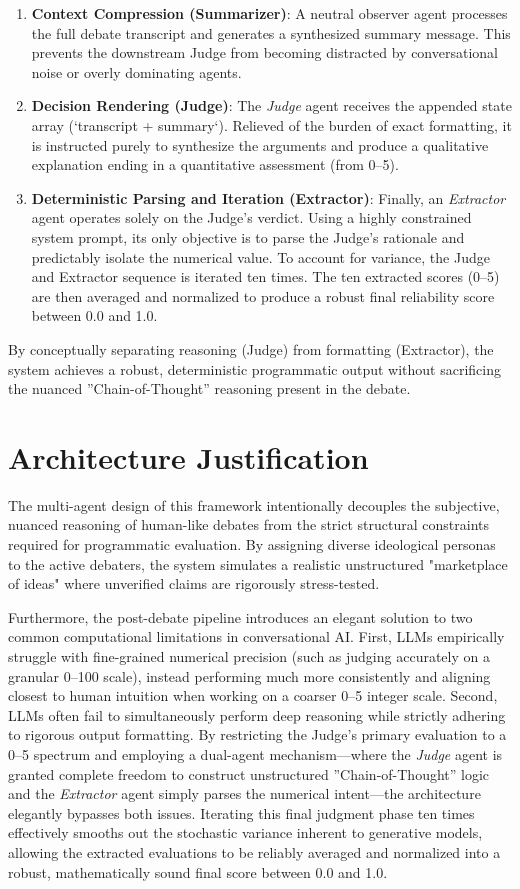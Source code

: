 \documentclass[sigconf,nonacm]{acmart}
\begin{document}
\begin{enumerate}
    \item \textbf{Context Compression (Summarizer)}: A neutral observer agent processes the full debate transcript and generates a synthesized summary message. This prevents the downstream Judge from becoming distracted by conversational noise or overly dominating agents.
    \item \textbf{Decision Rendering (Judge)}: The \textit{Judge} agent receives the appended state array (`transcript + summary`). Relieved of the burden of exact formatting, it is instructed purely to synthesize the arguments and produce a qualitative explanation ending in a quantitative assessment (from 0--5).
    \item \textbf{Deterministic Parsing and Iteration (Extractor)}: Finally, an \textit{Extractor} agent operates solely on the Judge's verdict. Using a highly constrained system prompt, its only objective is to parse the Judge's rationale and predictably isolate the numerical value. To account for variance, the Judge and Extractor sequence is iterated ten times. The ten extracted scores (0--5) are then averaged and normalized to produce a robust final reliability score between 0.0 and 1.0.
\end{enumerate}
By conceptually separating reasoning (Judge) from formatting (Extractor), the system achieves a robust, deterministic programmatic output without sacrificing the nuanced ''Chain-of-Thought'' reasoning present in the debate.

\section{Architecture Justification}\label{sec:justification}
The multi-agent design of this framework intentionally decouples the subjective, nuanced reasoning of human-like debates from the strict structural constraints required for programmatic evaluation. By assigning diverse ideological personas to the active debaters, the system simulates a realistic unstructured "marketplace of ideas" where unverified claims are rigorously stress-tested. 

Furthermore, the post-debate pipeline introduces an elegant solution to two common computational limitations in conversational AI. First, LLMs empirically struggle with fine-grained numerical precision (such as judging accurately on a granular 0--100 scale), instead performing much more consistently and aligning closest to human intuition when working on a coarser 0--5 integer scale. Second, LLMs often fail to simultaneously perform deep reasoning while strictly adhering to rigorous output formatting. By restricting the Judge's primary evaluation to a 0--5 spectrum and employing a dual-agent mechanism—where the \textit{Judge} agent is granted complete freedom to construct unstructured ''Chain-of-Thought'' logic and the \textit{Extractor} agent simply parses the numerical intent—the architecture elegantly bypasses both issues. Iterating this final judgment phase ten times effectively smooths out the stochastic variance inherent to generative models, allowing the extracted evaluations to be reliably averaged and normalized into a robust, mathematically sound final score between 0.0 and 1.0.
\end{document}
